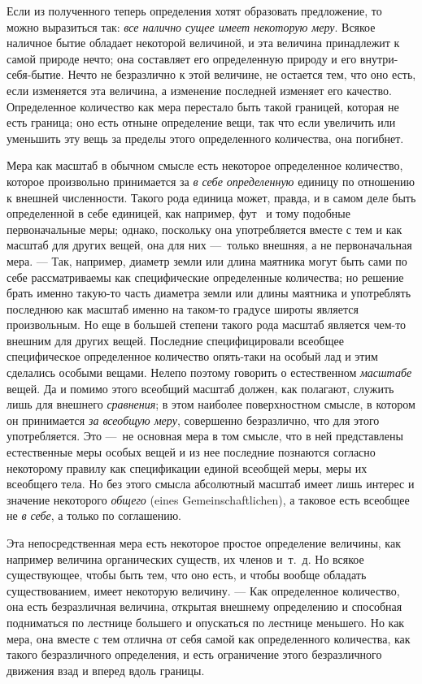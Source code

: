 Если из полученного теперь определения хотят образовать предложение, то
можно выразиться так: {\em все налично сущее имеет
некоторую меру}. Всякое наличное бытие обладает некоторой величиной, и эта
величина принадлежит к самой природе нечто; она составляет его определенную
природу и его внутри-себя-бытие. Нечто не безразлично к этой величине, не
остается тем, что оно есть, если изменяется эта величина, а изменение
последней изменяет его качество. Определенное количество как мера перестало
быть такой границей, которая не есть граница; оно есть отныне определение
вещи, так что если увеличить или уменьшить эту вещь за пределы этого
определенного количества, она погибнет.

Мера как масштаб в обычном смысле есть некоторое определенное количество,
которое произвольно принимается за {\em в себе
определенную} единицу по отношению к внешней численности. Такого рода
единица может, правда, и в самом деле быть определенной в себе единицей,
как например,
{фут}~\label{bkm:Ref474666577}
и тому подобные первоначальные меры; однако, поскольку она употребляется
вместе с тем и как масштаб для других вещей, она для них —~только внешняя,
а не первоначальная мера. — Так, например, диаметр земли или длина маятника
могут быть сами по себе рассматриваемы как специфические определенные
количества; но решение брать именно такую-то часть диаметра земли или длины
маятника и употреблять последнюю как масштаб именно на таком-то градусе
широты является произвольным. Но еще в большей степени такого рода масштаб
является чем-то внешним для других вещей. Последние специфицировали
всеобщее специфическое определенное количество опять-таки на особый лад и
этим сделались особыми вещами. Нелепо поэтому говорить о естественном
{\em масштабе} вещей. Да и помимо этого всеобщий
масштаб должен, как полагают, служить лишь для внешнего
{\em сравнения}; в этом наиболее поверхностном смысле,
в котором он принимается {\em за всеобщую меру},
совершенно безразлично, что для этого употребляется. Это —~не основная мера
в том смысле, что в ней представлены естественные меры особых вещей и из
нее последние познаются согласно некоторому правилу как спецификации единой
всеобщей меры, меры их всеобщего тела. Но без этого смысла абсолютный
масштаб имеет лишь интерес и значение некоторого
{\em общего} (eines Gemeinschaftlichen), а таковое есть
всеобщее не {\em в себе}, а только по соглашению.

Эта непосредственная мера есть некоторое простое определение величины, как
например величина органических существ, их членов и~т.~д. Но всякое
существующее, чтобы быть тем, что оно есть, и чтобы вообще обладать
существованием, имеет некоторую величину. — Как определенное количество,
она есть безразличная величина, открытая внешнему определению и способная
подниматься по лестнице большего и опускаться по лестнице меньшего. Но как
мера, она вместе с тем отлична от себя самой как определенного количества,
как такого безразличного определения, и есть ограничение этого
безразличного движения взад и вперед вдоль границы.

